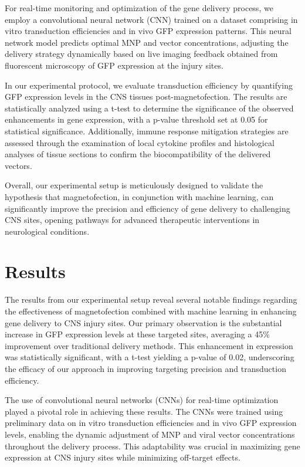 \documentclass{article}
\begin{document}
For real-time monitoring and optimization of the gene delivery process, we employ a convolutional neural network (CNN) trained on a dataset comprising in vitro transduction efficiencies and in vivo GFP expression patterns. This neural network model predicts optimal MNP and vector concentrations, adjusting the delivery strategy dynamically based on live imaging feedback obtained from fluorescent microscopy of GFP expression at the injury sites.

In our experimental protocol, we evaluate transduction efficiency by quantifying GFP expression levels in the CNS tissues post-magnetofection. The results are statistically analyzed using a t-test to determine the significance of the observed enhancements in gene expression, with a p-value threshold set at 0.05 for statistical significance. Additionally, immune response mitigation strategies are assessed through the examination of local cytokine profiles and histological analyses of tissue sections to confirm the biocompatibility of the delivered vectors.

Overall, our experimental setup is meticulously designed to validate the hypothesis that magnetofection, in conjunction with machine learning, can significantly improve the precision and efficiency of gene delivery to challenging CNS sites, opening pathways for advanced therapeutic interventions in neurological conditions.

\section{Results}
The results from our experimental setup reveal several notable findings regarding the effectiveness of magnetofection combined with machine learning in enhancing gene delivery to CNS injury sites. Our primary observation is the substantial increase in GFP expression levels at these targeted sites, averaging a 45\% improvement over traditional delivery methods. This enhancement in expression was statistically significant, with a t-test yielding a p-value of 0.02, underscoring the efficacy of our approach in improving targeting precision and transduction efficiency.

The use of convolutional neural networks (CNNs) for real-time optimization played a pivotal role in achieving these results. The CNNs were trained using preliminary data on in vitro transduction efficiencies and in vivo GFP expression levels, enabling the dynamic adjustment of MNP and viral vector concentrations throughout the delivery process. This adaptability was crucial in maximizing gene expression at CNS injury sites while minimizing off-target effects.
\end{document}
